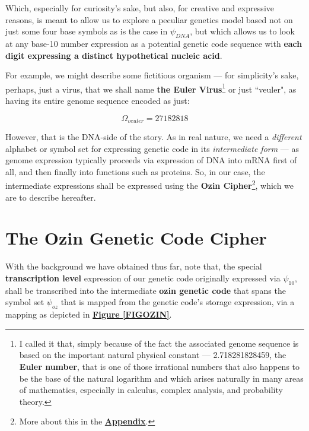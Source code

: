 \documentclass[a4paper, 18pt]{book} %
\begin{document}
Which, especially for curiosity's sake, but also, for creative and expressive reasons, is meant to allow us to explore a peculiar genetics model based not on just some four base symbols as is the case in $\psi_{DNA}$, but which allows us to look at any base-10 number expression as a potential genetic code sequence with \textbf{each digit expressing a distinct hypothetical nucleic acid}. 


For example, we might describe some fictitious organism --- for simplicity's sake, perhaps, just a virus, that we shall name \textbf{the Euler Virus}\footnote{I called it that, simply because of the fact the associated genome sequence is based on the important natural physical constant --- 2.718281828459, the \textbf{Euler number}, that is one of those irrational numbers that also happens to be the base of the natural logarithm and which arises naturally in many areas of mathematics, especially in calculus, complex analysis, and probability theory.} or just ``veuler", as having its entire genome sequence encoded as just:

\begin{equation}
\label{EQDNAV}
\Omega_{veuler} = 27182818
\end{equation}


However, that is the DNA-side of the story. As in real nature, we need a \textit{different} alphabet or symbol set for expressing genetic code in its \textit{intermediate form} --- as genome expression typically proceeds via expression of DNA into mRNA first of all, and then finally into functions such as proteins. So, in our case, the intermediate expressions shall be expressed using the \textbf{Ozin Cipher}\footnote{More about this in the \textbf{\hyperref[APPOZIN]{Appendix}}.}, which we are to describe hereafter.


\section{The Ozin Genetic Code Cipher}
\label{SECOZIN}

With the background we have obtained thus far, note that, the special \textbf{transcription level} expression of our genetic code originally expressed via $\psi_{10}$, shall be transcribed into the intermediate \textbf{ozin genetic code} that spans the symbol set $\psi_{oz}$ that is mapped from the genetic code's storage expression, via a mapping as depicted in \textbf{\hyperref[FIGOZIN]{Figure \ref{FIGOZIN}}}.
\end{document}
